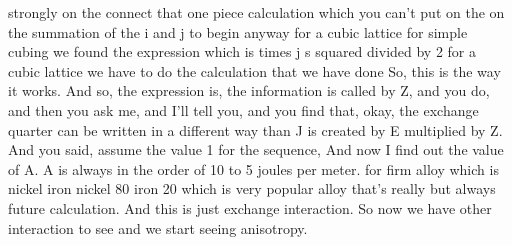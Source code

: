 strongly on the connect that one piece calculation which you can't put on the on the summation of the i and j to begin anyway for a cubic lattice for simple cubing we found the expression which is times j s squared divided by 2 for a cubic lattice we have to do the calculation that we have done So, this is the way it works. And so, the expression is, the information is called by Z, and you do, and then you ask me, and I'll tell you, and you find that, okay, the exchange quarter can be written in a different way than J is created by E multiplied by Z. And you said, assume the value 1 for the sequence, And now I find out the value of A. A is always in the order of 10 to 5 joules per meter. for firm alloy which is nickel iron nickel 80 iron 20 which is very popular alloy that's really but always future calculation. And this is just exchange interaction. So now we have other interaction to see and we start seeing anisotropy.
